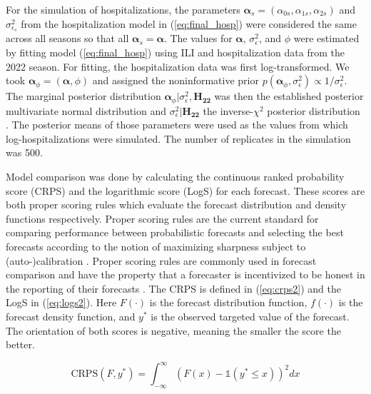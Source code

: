 \documentclass[ba]{imsart}
\theoremstyle{plain}
\theoremstyle{definition}
\theoremstyle{remark}
\begin{document}
For the simulation of hospitalizations, the parameters $\boldsymbol{\alpha}_s = (\alpha_{0s}, \alpha_{1s}, \alpha_{2s})$ and $\sigma^2_{\epsilon_s}$ from the hospitalization model in (\ref{eq:final_hosp}) were considered the same across all seasons so that all $\boldsymbol{\alpha}_s = \boldsymbol{\alpha}$. 
The values for $\boldsymbol{\alpha}$, $\sigma^2_{\epsilon}$, and $\phi$ were estimated by fitting model (\ref{eq:final_hosp}) using ILI and hospitalization data from the 2022 season. For fitting, the hospitalization data was first log-transformed. We took $\boldsymbol{\alpha}_{\phi} = (\boldsymbol{\alpha}, \phi)$
and assigned the noninformative prior $p(\boldsymbol{\alpha}_{\phi}, \sigma^2_{\epsilon}) \propto 1/\sigma^2_{\epsilon}$. The marginal posterior distribution $\boldsymbol{\alpha}_{\phi} | \sigma^2_{\epsilon}, \boldsymbol{H_{22}}$ was then the established posterior multivariate normal distribution and $\sigma^2_{\epsilon} | \boldsymbol{H_{22}}$ the inverse-$\chi^2$ posterior distribution \cite[]{gelman2013bayesian}. The posterior means of those parameters were used as the values from which log-hospitalizations were simulated. The number of replicates in the simulation was 500.


Model comparison was done by calculating the continuous ranked probability score (CRPS) and the logarithmic score (LogS) for each forecast. These scores are both proper scoring rules which evaluate the forecast distribution and density functions respectively. Proper scoring rules are the current standard for comparing performance between probabilistic forecasts and selecting the best forecasts according to the notion of maximizing sharpness subject to (auto-)calibration \cite[]{gneiting2007probabilistic, tsyplakov2013evaluation}. Proper scoring rules are commonly used in forecast comparison and have the property that a forecaster is incentivized to be honest in the reporting of their forecasts \cite[]{gneiting2007strictly, gneiting2014probabilistic}. The CRPS is defined in (\ref{eq:crps2}) and the LogS in (\ref{eq:logs2}). Here $F(\cdot)$ is the forecast distribution function, $f(\cdot)$ is the forecast density function, and $y^*$ is the observed targeted value of the forecast. The orientation of both scores is negative, meaning the smaller the score the better.

\begin{equation}
    \text{CRPS}(F, y^*) = \int_{-\infty}^{\infty} (F(x) - \mathbb{1} (y^* \leq x))^2 dx
    \label{eq:crps2}
\end{equation}
\end{document}
